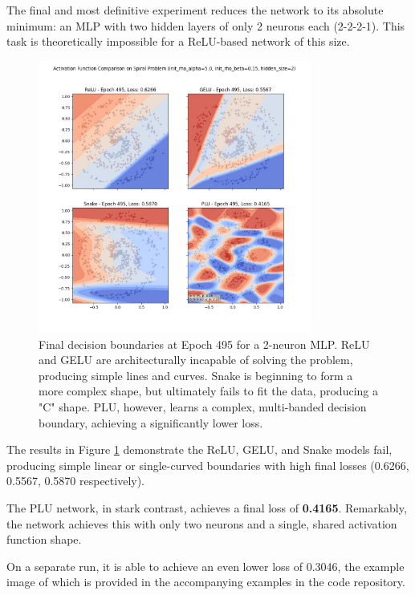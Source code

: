 \documentclass[11pt, letterpaper]{article}
\begin{document}
The final and most definitive experiment reduces the network to its absolute minimum: an MLP with two hidden layers of only 2 neurons each (2-2-2-1). This task is theoretically impossible for a ReLU-based network of this size.

\begin{figure}[H]
    \centering
    \includegraphics[width=0.8\textwidth]{Examples/spiral_activation_comparison_hidden_neurons_2_epoch_495.jpg}
    \caption{Final decision boundaries at Epoch 495 for a 2-neuron MLP. ReLU and GELU are architecturally incapable of solving the problem, producing simple lines and curves. Snake is beginning to form a more complex shape, but ultimately fails to fit the data, producing a "C" shape. PLU, however, learns a complex, multi-banded decision boundary, achieving a significantly lower loss.}
    \label{fig:spiral_2_neurons_final}
\end{figure}

The results in Figure \ref{fig:spiral_2_neurons_final} demonstrate the ReLU, GELU, and Snake models fail, producing simple linear or single-curved boundaries with high final losses (0.6266, 0.5567, 0.5870 respectively).

The PLU network, in stark contrast, achieves a final loss of \textbf{0.4165}. Remarkably, the network achieves this with only two neurons and a single, shared activation function shape.

On a separate run, it is able to achieve an even lower loss of 0.3046, the example image of which is provided in the accompanying examples in the code repository.
\end{document}
